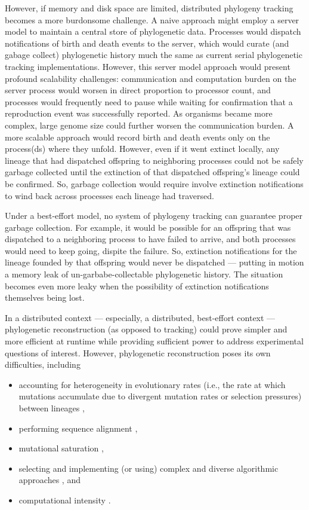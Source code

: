 However, if memory and disk space are limited, distributed phylogeny tracking becomes a more burdonsome challenge.
A naive approach might employ a server model to maintain a central store of phylogenetic data.
Processes would dispatch notifications of birth and death events to the server, which would curate (and gabage collect) phylogenetic history much the same as current serial phylogenetic tracking implementations.
However, this server model approach would present profound scalability challenges: communication and computation burden on the server process would worsen in direct proportion to processor count, and processes would frequently need to pause while waiting for confirmation that a reproduction event was successfully reported.
As organisms became more complex, large genome size could further worsen the communication burden.
A more scalable approach would record birth and death events only on the process(ds) where they unfold.
However, even if it went extinct locally, any lineage that had dispatched offspring to neighboring processes could not be safely garbage collected until the extinction of that dispatched offspring's lineage could be confirmed.
So, garbage collection would require involve extinction notifications to wind back across processes each lineage had traversed.


Under a best-effort model, no system of phylogeny tracking can guarantee proper garbage collection.
For example, it would be possible for an offspring that was dispatched to a neighboring process to have failed to arrive, and both processes would need to keep going, dispite the failure.
So, extinction notifications for the lineage founded by that offspring would never be dispatched --- putting in motion a memory leak of un-garbabe-collectable phylogenetic history.
The situation becomes even more leaky when the possibility of extinction notifications themselves being lost.

In a distributed context --- especially, a distributed, best-effort context --- phylogenetic reconstruction (as opposed to tracking) could prove simpler and more efficient at runtime while providing sufficient power to address experimental questions of interest.
However, phylogenetic reconstruction poses its own difficulties, including
\begin{itemize}
\item accounting for heterogeneity in evolutionary rates (i.e., the rate at which mutations accumulate due to divergent mutation rates or selection pressures) between lineages \citep{lack2010identifying},
\item performing sequence alignment \citep{casci2008lining},
\item mutational saturation \citep{hagstrom2004using},
\item selecting and implementing (or using) complex and diverse algorithmic approaches \citep{kapli2020phylogenetic}, and
\item computational intensity \citep{sarkar2010hardware}.
\end{itemize}

